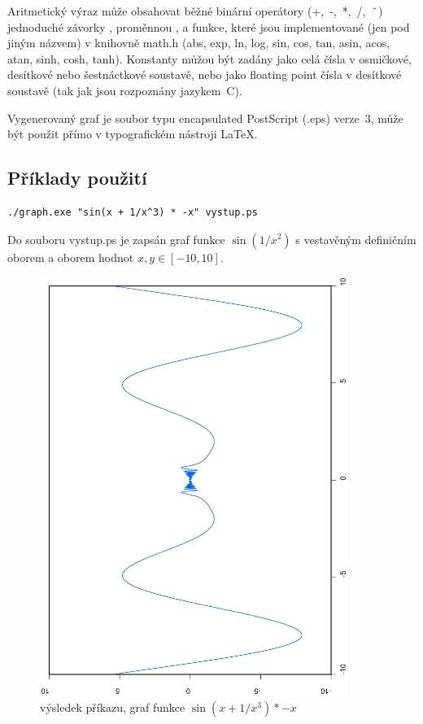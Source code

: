 \documentclass[11pt]{article}
\newcommand\CARET{\mathbin{\char`\^}}
\begin{document}
Aritmetický výraz může obsahovat běžné binární operátory (+,~-,~*,~/,~$\CARET$)
jednoduché závorky \uv{()}, proměnnou , a funkce, které jsou
implementované (jen pod jiným názvem) v knihovně math.h (abs, exp, ln, log,
sin, cos, tan, asin, acos, atan, sinh, cosh, tanh). Konstanty můžou být zadány
jako celá čísla v osmičkové, desítkové nebo šestnáctkové soustavě, nebo jako
floating point čísla v desítkové soustavě (tak jak jsou rozpoznány jazykem~C).

Vygenerovaný graf je soubor typu encapsulated PostScript (.eps) verze~3, může
být použit přímo v typografickém nástroji \LaTeX.

\clearpage
\subsection{Příklady použití}
\begin{verbatim}
./graph.exe "sin(x + 1/x^3) * -x" vystup.ps 
\end{verbatim}
Do souboru vystup.ps je zapsán graf funkce $\sin (1 / x^2)$
s vestavěným definičním oborem a oborem hodnot $x, y \in [-10, 10]$.
\begin{figure}[ht!]
\centering
	\includegraphics[width=10cm, angle=270]{figures/vystup1.eps}
	\caption{výsledek příkazu, graf funkce $\sin \left(x + 1/x^3 \right) * -x$}
\end{figure}
\clearpage
\end{document}
